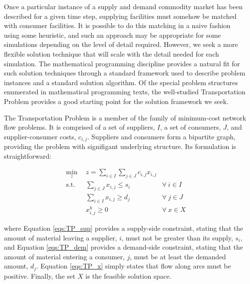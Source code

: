 Once a particular instance of a supply and demand commodity market has been
described for a given time step, supplying facilities must somehow be matched
with consumer facilities. It is possible to do this matching in a naive fashion
using some heuristic, and such an approach may be appropriate for some
simulations depending on the level of detail required. However, we seek a more
flexible solution technique that will scale with the detail needed for each
simulation. The mathematical programming discipline provides a natural fit for
such solution techniques through a standard framework used to describe problem
instances and a standard solution algorithm. Of the special problem structures
enumerated in mathematical programming texts, the well-studied Transportation
Problem provides a good starting point for the solution framework we seek.

The Transportation Problem is a member of the family of minimum-cost network
flow problems. It is comprised of a set of suppliers, $I$, a set of consumers,
$J$, and supplier-consumer costs, $c_{i,j}$. Suppliers and consumers form a
bipartite graph, providing the problem with signifigant underlying
structure. Its formulation is straightforward:

\begin{subequations}\label{eqs:TP}
  \begin{align}
    \min_{z} \:\: & 
    z = \sum_{i \in I}\sum_{j \in J} c_{i,j} x_{i,j} 
    & \label{eqs:TP_obj} \\
    \text{s.t.} \:\: &
    \sum_{j \in J} x_{i,j} \leq s_{i} 
    &
    \forall \: i \in I \label{eqs:TP_sup} \\
    &
    \sum_{i \in I} x_{i,j} \geq d_{j} 
    & 
    \forall \: j \in J \label{eqs:TP_dem} \\
    &
    x^h_{i,j} \geq 0
    &
    \forall \: x \in X \label{eqs:TP_x}
  \end{align}
\end{subequations}

where Equation \ref{eqs:TP_sup} provides a supply-side constraint, stating that
the amount of material leaving a supplier, $i$, must not be greater than its
supply, $s_i$, and Equation \ref{eqs:TP_dem} provides a demand-side constraint,
stating that the amount of material entering a consumer, $j$, must be at least
the demanded amount, $d_j$. Equation \ref{eqs:TP_x} simply states that flow
along arcs must be positive. Finally, the set $X$ is the feasible solution
space.


